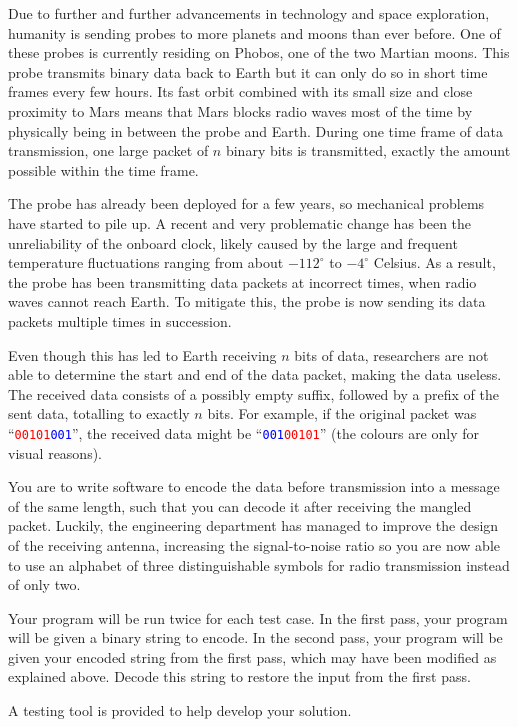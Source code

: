 



%
Due to further and further advancements in technology and space exploration, humanity is sending probes to more planets and moons than ever before.
One of these probes is currently residing on Phobos, one of the two Martian moons.
This probe transmits binary data back to Earth but it can only do so in short time frames every few hours.
Its fast orbit combined with its small size and close proximity to Mars means that Mars blocks radio waves most of the time by physically being in between the probe and Earth.
During one time frame of data transmission, one large packet of $n$ binary bits is transmitted, exactly the amount possible within the time frame.

The probe has already been deployed for a few years, so mechanical problems have started to pile up.
A recent and very problematic change has been the unreliability of the onboard clock, likely caused by the large and frequent temperature fluctuations ranging from about $-112^\circ$ to $-4^\circ$ Celsius.
As a result, the probe has been transmitting data packets at incorrect times, when radio waves cannot reach Earth.
To mitigate this, the probe is now sending its data packets multiple times in succession.

Even though this has led to Earth receiving $n$ bits of data, researchers are not able to determine the start and end of the data packet, making the data useless.
The received data consists of a possibly empty suffix, followed by a prefix of the sent data, totalling to exactly $n$ bits.
For example, if the original packet was ``\textcolor{red}{\texttt{00101}}\textcolor{blue}{\texttt{001}}'', the received data might be ``\textcolor{blue}{\texttt{001}}\textcolor{red}{\texttt{00101}}'' (the colours are only for visual reasons).

You are to write software to encode the data before transmission into a message of the same length, such that you can decode it after receiving the mangled packet.
Luckily, the engineering department has managed to improve the design of the receiving antenna, increasing the signal-to-noise ratio so you are now able to use an alphabet of three distinguishable symbols for radio transmission instead of only two.

Your program will be run twice for each test case.
In the first pass, your program will be given a binary string to encode.
In the second pass, your program will be given your encoded string from the first pass, which may have been modified as explained above.
Decode this string to restore the input from the first pass.

A testing tool is provided to help develop your solution.


